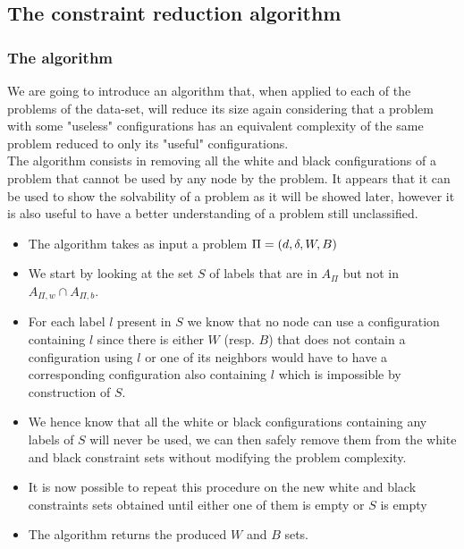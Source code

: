 \subsection{The constraint reduction algorithm}\label{sec:CR}

\subsubsection{The algorithm}
We are going to introduce an algorithm that, when applied to each of the problems of the data-set, will reduce its size again considering that a problem with some "useless" configurations has an equivalent complexity of the same problem reduced to only its "useful" configurations.\\

The algorithm consists in removing all the white and black configurations of a problem that cannot be used by any node by the problem. It appears that it can be used to show the solvability of a problem as it will be showed later, however it is also useful to have a better understanding of a problem still unclassified.
\begin{itemize}
    \item The algorithm takes as input a problem $\Pi = (d,\delta,W,B)$
    \item We start by looking at the set $S$ of labels that are in $A_{\Pi}$ but not in  $A_{\Pi,w} \cap A_{\Pi,b}$.
    \item For each label $l$ present in $S$ we know that no node can use a configuration containing $l$ since there is either $W$ (resp. $B$) that does not contain a configuration using $l$ or one of its neighbors would have to have a corresponding configuration also containing $l$ which is impossible by construction of $S$.
    \item We hence know that all the white or black configurations containing any labels of $S$ will never be used, we can then safely remove them from the white and black constraint sets without modifying the problem complexity.
    \item It is now possible to repeat this procedure on the new white and black constraints sets obtained until either one of them is empty or $S$ is empty
    \item The algorithm returns the produced $W$ and $B$ sets.
\end{itemize}
